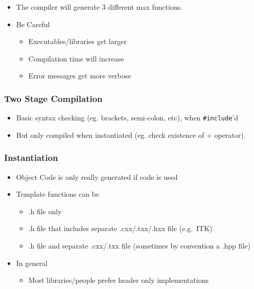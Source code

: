 \begin{itemize}
\itemsep1pt\parskip0pt
\item
  The compiler will generate 3 different max functions.
\item
  Be Careful

  \begin{itemize}
  \itemsep1pt\parskip0pt
  \item
    Executables/libraries get larger
  \item
    Compilation time will increase
  \item
    Error messages get more verbose
  \end{itemize}
\end{itemize}

\subsubsection{Two Stage Compilation}\label{two-stage-compilation}

\begin{itemize}
\itemsep1pt\parskip0pt
\item
  Basic syntax checking (eg. brackets, semi-colon, etc), when
  \texttt{\#include}'d
\item
  But only compiled when instantiated (eg. check existence of +
  operator).
\end{itemize}

\subsubsection{Instantiation}\label{instantiation}

\begin{itemize}
\itemsep1pt\parskip0pt
\item
  Object Code is only really generated if code is used
\item
  Template functions can be

  \begin{itemize}
  \itemsep1pt\parskip0pt
  \item
    .h file only
  \item
    .h file that includes separate .cxx/.txx/.hxx file (e.g.~ITK)
  \item
    .h file and separate .cxx/.txx file (sometimes by convention a .hpp
    file)
  \end{itemize}
\item
  In general

  \begin{itemize}
  \itemsep1pt\parskip0pt
  \item
    Most libraries/people prefer header only implementations
  \end{itemize}
\end{itemize}

